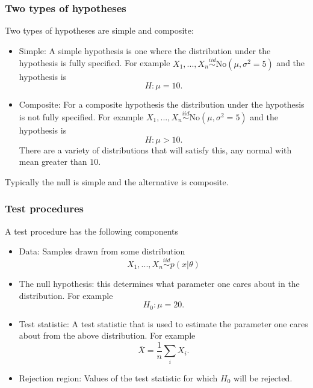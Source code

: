 \begin{frame}[fragile]\frametitle{Two types of hypotheses}

{\tiny
Two types of hypotheses are simple and composite:
\begin{itemize}
\item Simple: A simple hypothesis is one where the distribution
under the hypothesis is fully specified. For example
$X_1,...,X_n \stackrel{iid}{\sim} \mbox{No}(\mu,\sigma^2=5)$
and the hypothesis is
$$H:\mu=10.$$

\item Composite: For a composite hypothesis the distribution
under the hypothesis is not fully specified. For example
$X_1,...,X_n \stackrel{iid}{\sim} \mbox{No}(\mu,\sigma^2=5)$
and the hypothesis is
$$H:\mu > 10.$$
There are a variety of distributions that will satisfy this,
any normal with mean greater than $10$.
\end{itemize}

Typically the null is simple and the alternative is composite.

}
\end{frame}


\begin{frame}[fragile]\frametitle{Test procedures}

A test procedure has the following components
\begin{itemize}

\item Data: Samples drawn from some
distribution
$$X_1,...,X_n \stackrel{iid}{\sim} p(x|\theta)$$

\item The null hypothesis: this determines what parameter one
cares about in the distribution. For example
$$H_0: \mu=20.$$

\item Test statistic: A test statistic that is used to estimate
the parameter one cares about from the above distribution. For
example 
$$\bar{X} = \frac{1}{n} \sum_i X_i.$$

\item Rejection region: Values of the test statistic for which
$H_0$ will be rejected.

\end{itemize}

\end{frame}



